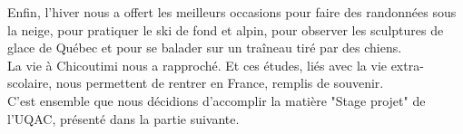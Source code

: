Enfin, l'hiver nous a offert les meilleurs occasions pour faire des randonnées sous la neige, pour pratiquer le ski de fond et alpin, pour observer les sculptures de glace de Québec et pour se balader sur un traîneau tiré par des chiens.\\ 

La vie à Chicoutimi nous a rapproché. Et ces études, liés avec la vie extra-scolaire, nous permettent de rentrer en France, remplis de souvenir.\\
C'est ensemble que nous décidions d'accomplir la matière "Stage projet" de l'UQAC, présenté dans la partie suivante.\\




